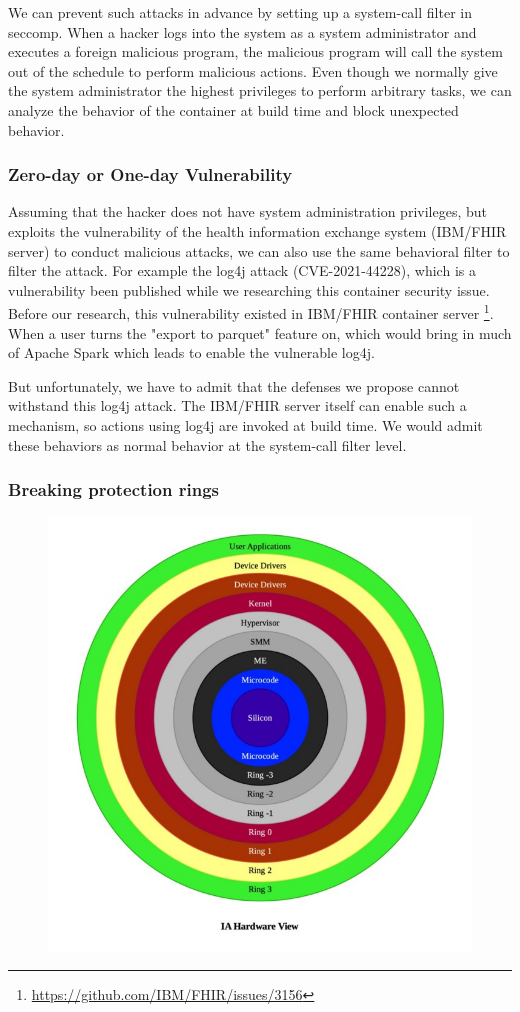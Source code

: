 We can prevent such attacks in advance by setting up a system-call filter
in seccomp. When a hacker logs into the system as a system administrator
and executes a foreign malicious program, the malicious program will call
the system out of the schedule to perform malicious actions.
Even though we normally give the system administrator the highest privileges
to perform arbitrary tasks, we can analyze the behavior of the container
at build time and block unexpected behavior.

\subsubsection{Zero-day or One-day Vulnerability}
Assuming that the hacker does not have system administration privileges,
but exploits the vulnerability of the health information exchange system
(IBM/FHIR server) to conduct malicious attacks, we can also use the same
behavioral filter to filter the attack.
For example the log4j attack (CVE-2021-44228), which is a vulnerability
been published while we researching this container security issue.
Before our research, this vulnerability existed in IBM/FHIR container server
\footnote{\url{https://github.com/IBM/FHIR/issues/3156}}.
When a user turns the "export to parquet" feature on, which would
bring in much of Apache Spark which leads to enable the vulnerable log4j.

But unfortunately, we have to admit that the defenses we propose cannot
withstand this log4j attack. The IBM/FHIR server itself can enable such a mechanism,
so actions using log4j are invoked at build time. We would admit these
behaviors as normal behavior at the system-call filter level.

\subsubsection{Breaking protection rings}

\begin{figure}
    \centering
    \includegraphics[width=.5\textwidth]{src/ring.jpeg}
    \label{ring}
\end{figure}

